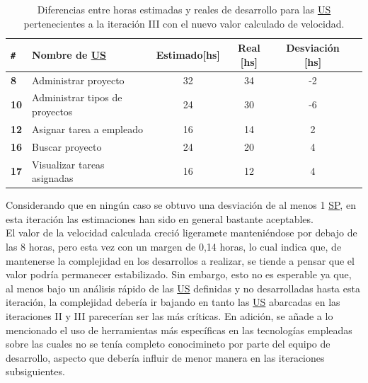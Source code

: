 \documentclass[a4paper, 12pt,twoside]{report}  %
\numberwithin{equation}{subsection} %
\begin{document}
\begin{table}[h!]
	\centering
	\captionsetup{justification=centering,margin=1.5cm}
	\begin{tabular}{ |p{0.5cm}|l|c|c|c|c| }
		\hline
		\verb|#|& \textbf{Nombre de \hyperlink{US}{US}}& \textbf{Estimado[hs]} & \textbf{Real [hs]} & \textbf{Desviación [hs]} \\
		\hline
		\textbf{8} & Administrar proyecto & 32 & 34 & \cellcolor{diferencia_estimacion_negativa}-2 \\
		\hline
		\textbf{10} & Administrar tipos de proyectos & 24 & 30 & \cellcolor{diferencia_estimacion_negativa}-6 \\
		\hline
		\textbf{12} & Asignar tarea a empleado & 16 & 14 & \cellcolor{diferencia_estimacion_positiva}2 \\
		\hline
		\textbf{16} & Buscar proyecto & 24 & 20 & \cellcolor{diferencia_estimacion_positiva}4 \\
		\hline
		\textbf{17} & Visualizar tareas asignadas & 16 & 12 & \cellcolor{diferencia_estimacion_positiva}4 \\
		\hline
	\end{tabular}
	\caption{Diferencias entre horas estimadas y reales de desarrollo para las \protect\hyperlink{US}{US} pertenecientes a la iteración III con el nuevo valor calculado de velocidad.}
	\label{tabla_dif_horas_estim_iter_3}
\end{table}

\indent Considerando que en ningún caso se obtuvo una desviación de al menos 1 \hyperlink{SP}{SP}, en esta iteración las estimaciones han sido en general bastante aceptables.\\
\indent El valor de la velocidad calculada creció ligeramete manteniéndose por debajo de las 8 horas, pero esta vez con un margen de 0,14 horas, lo cual indica que, de mantenerse la complejidad en los desarrollos a realizar, se tiende a pensar que el valor podría permanecer estabilizado. Sin embargo, esto no es esperable ya que, al menos bajo un análisis rápido de las \hyperlink{US}{US} definidas y no desarrolladas hasta esta iteración, la complejidad debería ir bajando en tanto las \hyperlink{US}{US} abarcadas en las iteraciones II y III parecerían ser las más críticas. En adición, se añade a lo mencionado el uso de herramientas más específicas en las tecnologías empleadas sobre las cuales no se tenía completo conocimineto por parte del equipo de desarrollo, aspecto que debería influir de menor manera en las iteraciones subsiguientes.
\end{document}
